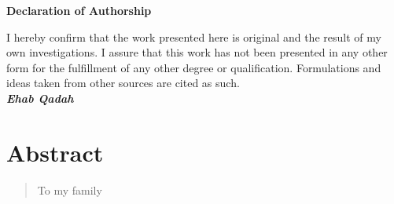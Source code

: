 \documentclass[12pt, %
a4paper, %
twoside, %
openright, %
abstract=on, %
DIV=11,      %
BCOR=8mm,openright]{scrbook}
\begin{document}
	\frontmatter
	
	

	\vspace{4cm}
	
	
	\thispagestyle{empty}
	{\noindent%
		\huge{\textbf{\textsf{Declaration of Authorship}}}
	}
	\vspace{2cm}
	\begin{flushleft}
		\noindent%
				
		I hereby confirm that the work presented here is original and the result of my own investigations. I assure that this work has not been presented in any other
		form for the fulfillment of any other degree or qualification. Formulations and ideas taken from other sources are cited as such.\\
		\vspace{1cm}
		\textbf{\textit{Ehab Qadah}}
	\end{flushleft}
	
	

	\chapter*{Abstract}
	\thispagestyle{empty}
    
    
    
	\newpage    
	\vspace*{\fill} 
	\begin{quote} 
		\centering 
		To my family 
	\end{quote}
	\vspace*{\fill}
	\tableofcontents
	\thispagestyle{empty}
	\listoffigures
	
	\mainmatter
	
		
	
	
	
	
	
	
	
	\FloatBarrier
	

	
	 
\end{document}
